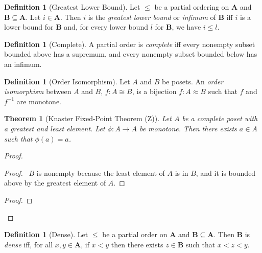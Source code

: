 \documentclass{book}
\let\qed\relax
\newtheorem{thm}[ax]{Theorem}
\theoremstyle{definition}
\newtheorem{df}[ax]{Definition}
\begin{document}
\begin{df}[Greatest Lower Bound]
Let $\leq$ be a partial ordering on $\mathbf{A}$ and $\mathbf{B} \subseteq \mathbf{A}$. Let $i \in \mathbf{A}$. Then $i$ is the \emph{greatest lower bound} or \emph{infimum} of $\mathbf{B}$ iff $i$ is a lower bound for $\mathbf{B}$ and, for every lower bound $l$ for $\mathbf{B}$, we have $i \leq l$.
\end{df}

\begin{df}[Complete]
A partial order is \emph{complete} iff every nonempty subset bounded above has a supremum, and every nonempty subset bounded below has an infimum.
\end{df}

\begin{df}[Order Isomorphism]
Let $A$ and $B$ be posets. An \emph{order isomorphism} between $A$ and $B$, $f : A \cong B$, is a bijection $f : A \approx B$ such that $f$ and $f^{-1}$ are monotone.
\end{df}
	
\begin{thm}[Knaster Fixed-Point Theorem (Z)]
Let $A$ be a complete poset with a greatest and least element. Let $\phi : A \rightarrow A$ be monotone. Then there exists $a \in A$ such that $\phi(a) = a$.
\end{thm}

\begin{proof}
\pf
{}
\begin{proof}
	\pf\ $B$ is nonempty because the least element of $A$ is in $B$, and it is bounded above by the greatest element of $A$.
\end{proof}
\begin{proof}
\end{proof}
\qed
\end{proof}

\begin{df}[Dense]
Let $\leq$ be a partial order on $\mathbf{A}$ and
$\mathbf{B} \subseteq \mathbf{A}$. Then $\mathbf{B}$ is \emph{dense} iff, for all $x,y \in \mathbf{A}$, if $x < y$ then there exists $z \in \mathbf{B}$ such that $x < z < y$.
\end{df}
\end{document}
